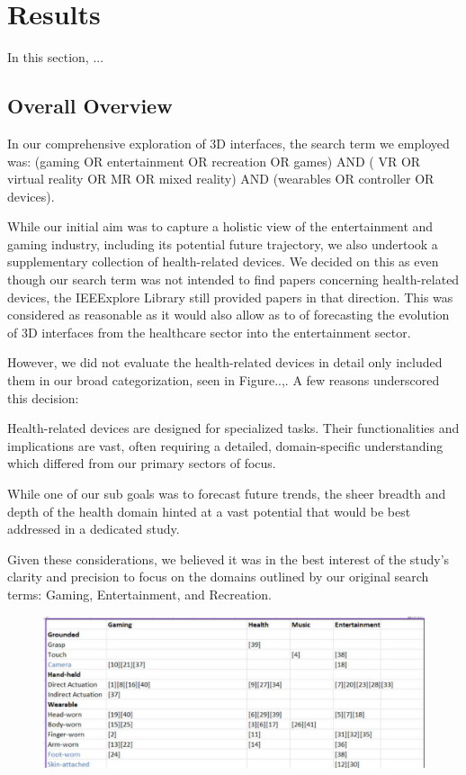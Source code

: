 \section{Results}
\label{sec:results}

In this section, ...


\subsection{Overall Overview}
\label{qual_res}


In our comprehensive exploration of 3D interfaces, the search term we employed was:
(gaming OR entertainment OR recreation OR games) AND ( VR OR virtual reality OR MR OR mixed reality) AND (wearables OR controller OR devices).

While our initial aim was to capture a holistic view of the entertainment and gaming industry, including its potential future trajectory, we also undertook a supplementary collection of health-related devices. We decided on this as even though our search term was not intended to find papers concerning health-related devices, the IEEExplore Library still provided papers in that direction. This was considered as reasonable as it would also allow as to of forecasting the evolution of 3D interfaces from the healthcare sector into the entertainment sector.

However, we did not evaluate the health-related devices in detail only included them in our broad categorization, seen in Figure..,. A few reasons underscored this decision:

Health-related devices are designed for specialized tasks. Their functionalities and implications are vast, often requiring a detailed, domain-specific understanding which differed from our primary sectors of focus.

While one of our sub goals was to forecast future trends, the sheer breadth and depth of the health domain hinted at a vast potential that would be best addressed in a dedicated study.

Given these considerations, we believed it was in the best interest of the study's clarity and precision to focus on the domains outlined by our original search terms: Gaming, Entertainment, and Recreation. 


\begin{figure}[htbp]
	\includegraphics[width=\columnwidth]{figures/broad.pdf}
	\label{fig:broad}
\end{figure}

